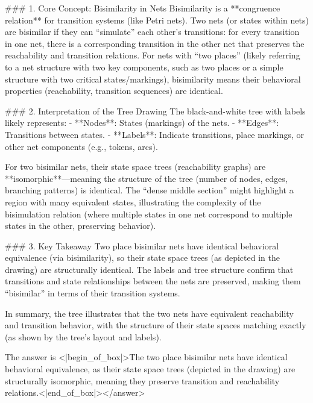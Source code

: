 ### 1. Core Concept: Bisimilarity in Nets  
Bisimilarity is a **congruence relation** for transition systems (like Petri nets). Two nets (or states within nets) are bisimilar if they can “simulate” each other’s transitions: for every transition in one net, there is a corresponding transition in the other net that preserves the reachability and transition relations. For nets with “two places” (likely referring to a net structure with two key components, such as two places or a simple structure with two critical states/markings), bisimilarity means their behavioral properties (reachability, transition sequences) are identical.    

### 2. Interpretation of the Tree Drawing  
The black-and-white tree with labels likely represents:  
- **Nodes**: States (markings) of the nets.  
- **Edges**: Transitions between states.  
- **Labels**: Indicate transitions, place markings, or other net components (e.g., tokens, arcs).  

For two bisimilar nets, their state space trees (reachability graphs) are **isomorphic**—meaning the structure of the tree (number of nodes, edges, branching patterns) is identical. The “dense middle section” might highlight a region with many equivalent states, illustrating the complexity of the bisimulation relation (where multiple states in one net correspond to multiple states in the other, preserving behavior).    

### 3. Key Takeaway  
Two place bisimilar nets have identical behavioral equivalence (via bisimilarity), so their state space trees (as depicted in the drawing) are structurally identical. The labels and tree structure confirm that transitions and state relationships between the nets are preserved, making them “bisimilar” in terms of their transition systems.  

In summary, the tree illustrates that the two nets have equivalent reachability and transition behavior, with the structure of their state spaces matching exactly (as shown by the tree’s layout and labels).  

The answer is <|begin_of_box|>The two place bisimilar nets have identical behavioral equivalence, as their state space trees (depicted in the drawing) are structurally isomorphic, meaning they preserve transition and reachability relations.<|end_of_box|></answer>